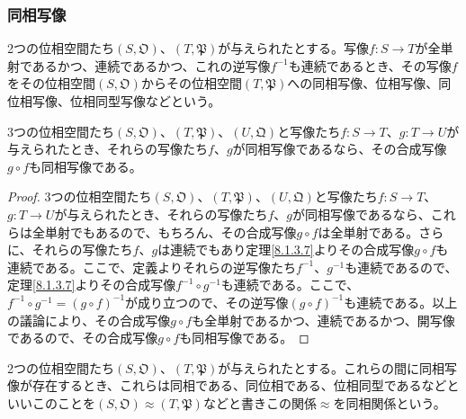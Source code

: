\documentclass[dvipdfmx]{jsarticle}
\begin{document}
\subsubsection{同相写像}%
\begin{dfn}
2つの位相空間たち$\left( S,\mathfrak{O} \right)$、$\left( T,\mathfrak{P} \right)$が与えられたとする。写像$f:S \rightarrow T$が全単射であるかつ、連続であるかつ、これの逆写像$f^{- 1}$も連続であるとき、その写像$f$をその位相空間$\left( S,\mathfrak{O} \right)$からその位相空間$\left( T,\mathfrak{P} \right)$への同相写像、位相写像、同位相写像、位相同型写像などという。
\end{dfn}
\begin{thm}\label{8.1.3.8}
3つの位相空間たち$\left( S,\mathfrak{O} \right)$、$\left( T,\mathfrak{P} \right)$、$\left( U,\mathfrak{Q} \right)$と写像たち$f:S \rightarrow T$、$g:T \rightarrow U$が与えられたとき、それらの写像たち$f$、$g$が同相写像であるなら、その合成写像$g \circ f$も同相写像である。
\end{thm}
\begin{proof}
3つの位相空間たち$\left( S,\mathfrak{O} \right)$、$\left( T,\mathfrak{P} \right)$、$\left( U,\mathfrak{Q} \right)$と写像たち$f:S \rightarrow T$、$g:T \rightarrow U$が与えられたとき、それらの写像たち$f$、$g$が同相写像であるなら、これらは全単射でもあるので、もちろん、その合成写像$g \circ f$は全単射である。さらに、それらの写像たち$f$、$g$は連続でもあり定理\ref{8.1.3.7}よりその合成写像$g \circ f$も連続である。ここで、定義よりそれらの逆写像たち$f^{- 1}$、$g^{- 1}$も連続であるので、定理\ref{8.1.3.7}よりその合成写像$f^{- 1} \circ g^{- 1}$も連続である。ここで、$f^{- 1} \circ g^{- 1} = (g \circ f)^{- 1}$が成り立つので、その逆写像$(g \circ f)^{- 1}$も連続である。以上の議論により、その合成写像$g \circ f$も全単射であるかつ、連続であるかつ、開写像であるので、その合成写像$g \circ f$も同相写像である。
\end{proof}
\begin{dfn}
2つの位相空間たち$\left( S,\mathfrak{O} \right)$、$\left( T,\mathfrak{P} \right)$が与えられたとする。これらの間に同相写像が存在するとき、これらは同相である、同位相である、位相同型であるなどといいこのことを$\left( S,\mathfrak{O} \right) \approx \left( T,\mathfrak{P} \right)$などと書きこの関係$\approx$を同相関係という。
\end{dfn}
\end{document}
